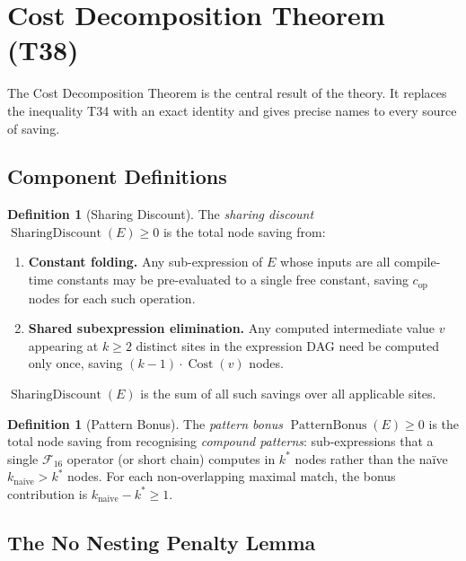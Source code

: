 \documentclass[12pt,a4paper]{article}
\theoremstyle{definition}
\newtheorem{definition}[theorem]{Definition}
\newcommand{\Cost}{\operatorname{Cost}}
\newcommand{\SD}{\operatorname{SharingDiscount}}
\newcommand{\PB}{\operatorname{PatternBonus}}
\begin{document}
\section{Cost Decomposition Theorem (T38)}
\label{sec:T38}

The Cost Decomposition Theorem is the central result of the theory.  It
replaces the inequality T34 with an exact identity and gives precise names to
every source of saving.

\subsection{Component Definitions}

\begin{definition}[Sharing Discount]
\label{def:SD}
The \emph{sharing discount} $\SD(E) \geq 0$ is the total node saving from:
\begin{enumerate}
  \item \textbf{Constant folding.}
        Any sub-expression of $E$ whose inputs are all compile-time constants
        may be pre-evaluated to a single free constant, saving $c_{\mathrm{op}}$
        nodes for each such operation.
  \item \textbf{Shared subexpression elimination.}
        Any computed intermediate value $v$ appearing at $k \geq 2$ distinct
        sites in the expression DAG need be computed only once, saving
        $(k-1)\cdot\Cost(v)$ nodes.
\end{enumerate}
$\SD(E)$ is the sum of all such savings over all applicable sites.
\end{definition}

\begin{definition}[Pattern Bonus]
\label{def:PB}
The \emph{pattern bonus} $\PB(E) \geq 0$ is the total node saving from
recognising \emph{compound patterns}: sub-expressions that a single
$\mathcal{F}_{16}$ operator (or short chain) computes in $k^*$ nodes rather
than the na\"{i}ve $k_{\mathrm{naive}} > k^*$ nodes.  For each non-overlapping
maximal match, the bonus contribution is $k_{\mathrm{naive}} - k^* \geq 1$.
\end{definition}

\subsection{The No Nesting Penalty Lemma}
\end{document}
